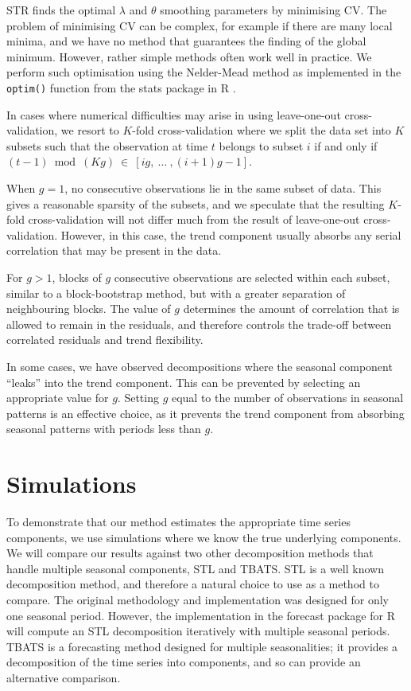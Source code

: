 \documentclass[11pt,a4paper,]{article}
\begin{document}
STR finds the optimal \(\lambda\) and \(\theta\) smoothing parameters by minimising CV. The problem of minimising CV can be complex, for example if there are many local minima, and we have no method that guarantees the finding of the global minimum. However, rather simple methods often work well in practice. We perform such optimisation using the Nelder-Mead method as implemented in the \texttt{optim()} function from the stats package in R \autocite{R}.

In cases where numerical difficulties may arise in using leave-one-out cross-validation, we resort to \(K\)-fold cross-validation where we split the data set into \(K\) subsets such that the observation at time \(t\) belongs to subset \(i\) if and only if \((t-1) \ \operatorname{mod}\ (K g) \ \in \ [i g, \ \dots \ , (i+1)g-1]\).

When \(g = 1\), no consecutive observations lie in the same subset of data. This gives a reasonable sparsity of the subsets, and we speculate that the resulting \(K\)-fold cross-validation will not differ much from the result of leave-one-out cross-validation. However, in this case, the trend component usually absorbs any serial correlation that may be present in the data.

For \(g>1\), blocks of \(g\) consecutive observations are selected within each subset, similar to a block-bootstrap method, but with a greater separation of neighbouring blocks. The value of \(g\) determines the amount of correlation that is allowed to remain in the residuals, and therefore controls the trade-off between correlated residuals and trend flexibility.

In some cases, we have observed decompositions where the seasonal component ``leaks'' into the trend component. This can be prevented by selecting an appropriate value for \(g\). Setting \(g\) equal to the number of observations in seasonal patterns is an effective choice, as it prevents the trend component from absorbing seasonal patterns with periods less than \(g\).

\hypertarget{simulations}{%
\section{Simulations}\label{simulations}}

To demonstrate that our method estimates the appropriate time series components, we use simulations where we know the true underlying components. We will compare our results against two other decomposition methods that handle multiple seasonal components, STL and TBATS. STL \autocite{cleveland1990stl} is a well known decomposition method, and therefore a natural choice to use as a method to compare. The original methodology and implementation was designed for only one seasonal period. However, the implementation in the forecast package for R \autocite{Rforecast} will compute an STL decomposition iteratively with multiple seasonal periods. TBATS \autocite{delivera2011forecasting} is a forecasting method designed for multiple seasonalities; it provides a decomposition of the time series into components, and so can provide an alternative comparison.
\end{document}
